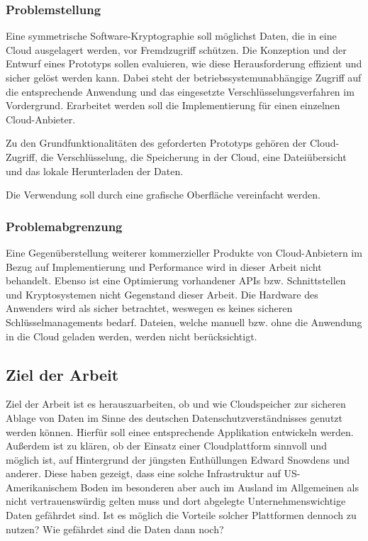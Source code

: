 \documentclass[12pt,a4paper,bibliography=totocnumbered,listof=totocnumbered]{scrartcl}
\begin{document}
\subsubsection{Problemstellung}
Eine symmetrische Software-Kryptographie soll möglichst Daten, die in eine Cloud ausgelagert werden,  vor Fremdzugriff schützen. Die Konzeption und der Entwurf eines Prototyps sollen evaluieren, wie diese Herausforderung effizient und sicher gelöst werden kann. Dabei steht der betriebssystemunabhängige Zugriff auf die entsprechende Anwendung und das eingesetzte Verschlüsselungsverfahren im Vordergrund. Erarbeitet werden soll die Implementierung für einen einzelnen Cloud-Anbieter. 

Zu den Grundfunktionalitäten des geforderten Prototyps gehören der Cloud-Zugriff, die Verschlüsselung, die Speicherung in der Cloud, eine Dateiübersicht und das lokale Herunterladen der Daten.

Die Verwendung soll durch eine grafische Oberfläche vereinfacht werden.

\subsubsection{Problemabgrenzung}
Eine Gegenüberstellung weiterer kommerzieller Produkte von Cloud-Anbietern im Bezug auf Implementierung und Performance wird in dieser Arbeit nicht behandelt. Ebenso ist eine Optimierung vorhandener APIs bzw. Schnittstellen und Kryptosystemen nicht Gegenstand dieser Arbeit. Die Hardware des Anwenders wird als sicher betrachtet, weswegen es keines sicheren Schlüsselmanagements bedarf. Dateien, welche manuell bzw. ohne die Anwendung in die Cloud geladen werden, werden nicht berücksichtigt.

\subsection{Ziel der Arbeit}
Ziel der Arbeit ist es herauszuarbeiten, ob und wie Cloudspeicher zur sicheren Ablage von Daten im Sinne des deutschen Datenschutzverständnisses genutzt werden können. Hierfür soll einee entsprechende Applikation entwickeln werden. Außerdem ist zu klären, ob der Einsatz einer Cloudplattform sinnvoll und möglich ist, auf Hintergrund der jüngsten Enthüllungen Edward Snowdens und anderer. Diese haben gezeigt, dass eine solche Infrastruktur auf US-Amerikanischem Boden im besonderen aber auch im Ausland im Allgemeinen als nicht vertrauenswürdig gelten muss und dort abgelegte Unternehmenswichtige Daten gefährdet sind. Ist es möglich die Vorteile solcher Plattformen dennoch zu nutzen? Wie gefährdet sind die Daten dann noch?
\end{document}
